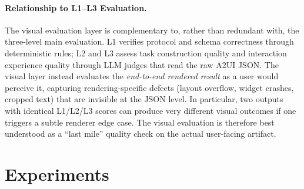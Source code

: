 \documentclass{llmxive}
\begin{document}
\paragraph{Relationship to L1--L3 Evaluation.}
The visual evaluation layer is complementary to, rather than redundant with, the three-level main evaluation. L1 verifies protocol and schema correctness through deterministic rules; L2 and L3 assess task construction quality and interaction experience quality through LLM judges that read the raw A2UI JSON. The visual layer instead evaluates the \emph{end-to-end rendered result} as a user would perceive it, capturing rendering-specific defects (layout overflow, widget crashes, cropped text) that are invisible at the JSON level. In particular, two outputs with identical L1/L2/L3 scores can produce very different visual outcomes if one triggers a subtle renderer edge case. The visual evaluation is therefore best understood as a ``last mile'' quality check on the actual user-facing artifact.

\section{Experiments}
\end{document}
